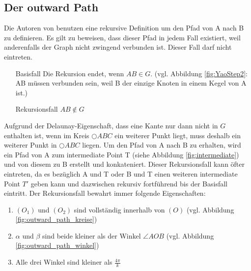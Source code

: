\documentclass[a4paper,twoside]{IEEEtran}
\begin{document}
\subsection{Der outward Path}
Die Autoren von \cite{kanj} benutzen eine rekursive Definition um den Pfad von A nach B zu definieren.
Es gilt zu beweisen, dass dieser Pfad in jedem Fall existiert, weil anderenfalls der Graph nicht zwingend verbunden ist.
Dieser Fall darf nicht eintreten.

\begin{enumerate}[\IEEEsetlabelwidth{12}]
\item[Basisfall] Die Rekursion endet, wenn $AB \in G $. (vgl. Abbildung \ref{fig:YaoStep2}: AB müssen verbunden sein, weil B der einzige Knoten in einem Kegel von A ist.)
\item[Rekursionsfall] $AB \notin G $
\end{enumerate}
Aufgrund der Delaunay-Eigenschaft, dass eine Kante nur dann nicht in $G $ enthalten ist, wenn im Kreis $\bigcirc {ABC} $ ein weiterer Punkt liegt, muss deshalb ein weiterer Punkt in  $\bigcirc {ABC} $ liegen.
Um den Pfad von A nach B zu erhalten, wird ein Pfad von A zum intermediate Point T (siehe Abbildung \ref{fig:intermediate}) und von diesem zu B erstellt und konkateniert.
Dieser Rekursionsfall kann öfter eintreten, da es bezüglich A und T oder B und T einen weiteren intermediate Point $T' $ geben kann und dazwischen rekursiv fortführend bis der Basisfall eintritt.
Der Rekursionsfall bewahrt immer folgende Eigenschaften:
\begin{enumerate}
\item $(O_1) $ und $(O_2) $ sind vollständig innerhalb von $(O) $ (vgl. Abbildung \ref{fig:outward_path_kreise})
\item $\alpha $ und $\beta $ sind beide kleiner als der Winkel $\angle {AOB} $ (vgl. Abbildung \ref{fig:outward_path_winkel}) 
\item Alle drei Winkel sind kleiner als $\frac{4\pi}{k} $
\end{enumerate}
\end{document}
